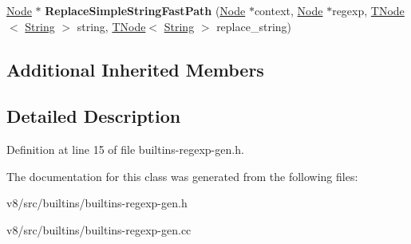 \begin{DoxyCompactItemize}
\mbox{\hyperlink{classv8_1_1internal_1_1compiler_1_1Node}{Node}} $\ast$ {\bfseries Replace\+Simple\+String\+Fast\+Path} (\mbox{\hyperlink{classv8_1_1internal_1_1compiler_1_1Node}{Node}} $\ast$context, \mbox{\hyperlink{classv8_1_1internal_1_1compiler_1_1Node}{Node}} $\ast$regexp, \mbox{\hyperlink{classv8_1_1internal_1_1compiler_1_1TNode}{T\+Node}}$<$ \mbox{\hyperlink{classv8_1_1internal_1_1String}{String}} $>$ string, \mbox{\hyperlink{classv8_1_1internal_1_1compiler_1_1TNode}{T\+Node}}$<$ \mbox{\hyperlink{classv8_1_1internal_1_1String}{String}} $>$ replace\+\_\+string)
\end{DoxyCompactItemize}
\subsection*{Additional Inherited Members}


\subsection{Detailed Description}


Definition at line 15 of file builtins-\/regexp-\/gen.\+h.



The documentation for this class was generated from the following files\+:\begin{DoxyCompactItemize}
\item 
v8/src/builtins/builtins-\/regexp-\/gen.\+h\item 
v8/src/builtins/builtins-\/regexp-\/gen.\+cc\end{DoxyCompactItemize}
